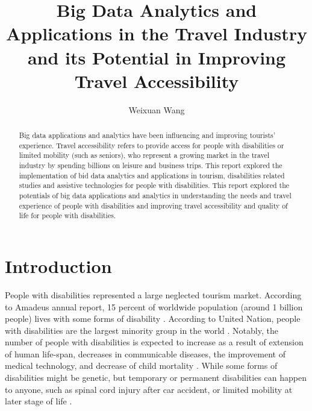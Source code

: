 \title{Big Data Analytics and Applications in the Travel Industry and its Potential in Improving Travel Accessibility}


\author{Weixuan Wang}
 

\renewcommand{\shortauthors}{Weixuan Wang}


\begin{abstract}
Big data applications and analytics have been influencing and improving 
tourists' experience. Travel accessibility refers to provide access for 
people with disabilities or limited mobility (such as seniors), who represent
a growing market in the travel industry by spending billions on leisure and 
business trips. This report explored the implementation of bid data analytics
and applications in tourism, disabilities related studies and assistive technologies
for people with disabilities. This report explored the potentials of big data applications
and analytics in understanding the needs and travel experience of people with disabilities
and improving travel accessibility and quality of life for people with disabilities.
\end{abstract}



\maketitle



\section{Introduction}
People with disabilities represented a large neglected tourism market. According to
Amadeus annual report, 15 percent of worldwide population (around 1 billion people) lives
with some forms of disability \cite{Ama}. According to United Nation, people with 
disabilities are the largest minority group in the world
\cite{Appleyard2005,DARCY2010816,Lex}. Notably, the number of people with disabilities is
expected to increase as a  result of extension of human life-span, decreases in
communicable diseases, the improvement of medical technology, and decrease of child
mortality \cite{SMITH1987376}.  While some forms of disabilities might be genetic, but
temporary or permanent disabilities can happen to anyone, such 
as spinal cord injury after car accident, or limited mobility at later stage of life
\cite{Lex}. 

